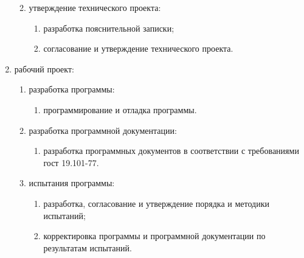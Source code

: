 \begin{enumerate}
\begin{enumerate}
\begin{enumerate}
        \end{enumerate}
        \item утверждение технического проекта:
        \begin{enumerate}
            \item разработка пояснительной записки;
            \item согласование и утверждение технического проекта.
        \end{enumerate}
    \end{enumerate}
    \item рабочий проект:
    \begin{enumerate}
        \item разработка программы:
        \begin{enumerate}
            \item программирование и отладка программы.
        \end{enumerate}
        \item разработка программной документации:
        \begin{enumerate}
            \item разработка программных документов в соответствии с требованиями гост 19.101-77.
        \end{enumerate}
        \item испытания программы:
        \begin{enumerate}
            \item разработка, согласование и утверждение порядка и методики испытаний;
            \item корректировка программы и программной документации по результатам испытаний.
        \end{enumerate}
    \end{enumerate}
\end{enumerate}